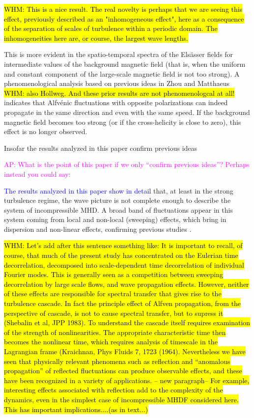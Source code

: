\documentclass[aip,pop,reprint,amsmath,amssymb,floatfix]{revtex4-1}
\def\ADD#1{{\textcolor{blue}{#1}}}
\def\AD#1{{\textcolor{magenta}{#1}}}
\def\WHM#1{{\hl{WHM: #1}}}
\begin{document}
\WHM{This is a nice result. The real novelty is perhaps that we are seeing this effect, previously described as an "inhomogeneous effect", here as a consequence of the separation of scales of turbulence within a periodic domain. The inhomogeneities here are, or course, the largest wave lengths.  }

This is more evident in the spatio-temporal spectra of the Els\"asser fields for intermediate values of the background magnetic field (that is, when the uniform and constant component of the large-scale magnetic field is not too strong). A phenomenological analysis based on previous ideas in Zhou and Matthaeus \cite{zhou1990remarks} \WHM{also Hollweg. And these prior results are not phenomenologcal at all!} indicates that Alfv\'enic fluctuations with opposite polarizations can indeed propagate in the same direction and even with the same speed. If the background magnetic field becomes too strong (or if the cross-helicity is close to zero), this effect is no longer observed. 

Insofar the results analyzed in this paper confirm previous ideas \cite{dmitruk_waves_2009, servidio_time_2011, lugones_2016_spatiotemporal} 

\AD{AP: What is the point of this paper if we only ``confirm previous ideas''? Perhaps instead you could say:}

\ADD{The  results analyzed in this paper show in detail} 
that, at least in the strong turbulence regime, the wave picture is not complete enough to describe the system of incompressible MHD. A broad band of fluctuations appear in this system coming from local and non-local (sweeping) effects, which bring in dispersion and non-linear effects, confirming  previous studies \cite{dmitruk_waves_2009, servidio_time_2011, lugones_2016_spatiotemporal}.

\WHM{Let's add after this sentence something like:
It is important to recall, of course, that much of the present study has concentrated on the Eulerian time decorrelation, decomposed into scale-dependent time decorrelation of individual Fourier modes.  This is generally seen as a competition between sweeping decorrelation by large scale flows, and wave propagation effects.
However, neither of these effects are responsible for spectral transfer that gives rise to the turbulence cascade. In fact the principle effect of Alfven propagation, from the perspective of cascade, is not to cause spectral transfer, but to supress it (Shebalin et al, JPP 1983). To understand the cascade itself requires examination of the strength of nonlinearities. The appropriate characteristic time then becomes the nonlinear time, which requires analysis of timescale in the Lagrangian frame (Kraichnan,
Phys Fluids 7, 1723 (1964). Nevertheless we have seen that physically relevant phenomena such as reflection and ``anomalous propagation'' of reflected fluctuations can produce observable effects, and these have been recognized in a variety of applications.
-- new paragraph--
  For example, interesting effects associated with reflection add to the complexity of the dynamics, even in the simplest case of incompressible MHDF considered here.  This has important implications....(as in text...)}
\end{document}
